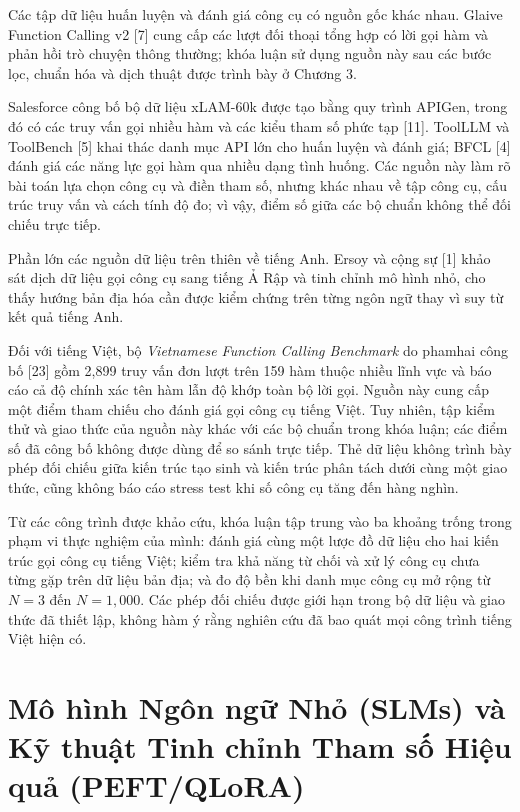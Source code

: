 Các tập dữ liệu huấn luyện và đánh giá công cụ có nguồn gốc khác nhau. Glaive Function Calling v2 [7] cung cấp các lượt đối thoại tổng hợp có lời gọi hàm và phản hồi trò chuyện thông thường; khóa luận sử dụng nguồn này sau các bước lọc, chuẩn hóa và dịch thuật được trình bày ở Chương 3.

Salesforce công bố bộ dữ liệu xLAM-60k được tạo bằng quy trình APIGen, trong đó có các truy vấn gọi nhiều hàm và các kiểu tham số phức tạp [11]. ToolLLM và ToolBench [5] khai thác danh mục API lớn cho huấn luyện và đánh giá; BFCL [4] đánh giá các năng lực gọi hàm qua nhiều dạng tình huống. Các nguồn này làm rõ bài toán lựa chọn công cụ và điền tham số, nhưng khác nhau về tập công cụ, cấu trúc truy vấn và cách tính độ đo; vì vậy, điểm số giữa các bộ chuẩn không thể đối chiếu trực tiếp.

Phần lớn các nguồn dữ liệu trên thiên về tiếng Anh. Ersoy và cộng sự [1] khảo sát dịch dữ liệu gọi công cụ sang tiếng Ả Rập và tinh chỉnh mô hình nhỏ, cho thấy hướng bản địa hóa cần được kiểm chứng trên từng ngôn ngữ thay vì suy từ kết quả tiếng Anh.

Đối với tiếng Việt, bộ \textit{Vietnamese Function Calling Benchmark} do phamhai công bố [23] gồm 2,899 truy vấn đơn lượt trên 159 hàm thuộc nhiều lĩnh vực và báo cáo cả độ chính xác tên hàm lẫn độ khớp toàn bộ lời gọi. Nguồn này cung cấp một điểm tham chiếu cho đánh giá gọi công cụ tiếng Việt. Tuy nhiên, tập kiểm thử và giao thức của nguồn này khác với các bộ chuẩn trong khóa luận; các điểm số đã công bố không được dùng để so sánh trực tiếp. Thẻ dữ liệu không trình bày phép đối chiếu giữa kiến trúc tạo sinh và kiến trúc phân tách dưới cùng một giao thức, cũng không báo cáo stress test khi số công cụ tăng đến hàng nghìn.

Từ các công trình được khảo cứu, khóa luận tập trung vào ba khoảng trống trong phạm vi thực nghiệm của mình: đánh giá cùng một lược đồ dữ liệu cho hai kiến trúc gọi công cụ tiếng Việt; kiểm tra khả năng từ chối và xử lý công cụ chưa từng gặp trên dữ liệu bản địa; và đo độ bền khi danh mục công cụ mở rộng từ $N=3$ đến $N=1{,}000$. Các phép đối chiếu được giới hạn trong bộ dữ liệu và giao thức đã thiết lập, không hàm ý rằng nghiên cứu đã bao quát mọi công trình tiếng Việt hiện có.

\section{Mô hình Ngôn ngữ Nhỏ (SLMs) và Kỹ thuật Tinh chỉnh Tham số Hiệu quả (PEFT/QLoRA)}

